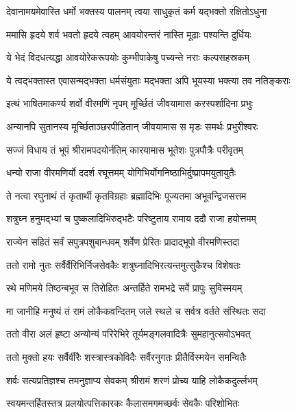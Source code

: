 
\twolineshloka
{देवानामयमेवास्ति धर्मो भक्तस्य पालनम्}
{त्वया साधुकृतं कर्म यद्भक्तो रक्षितोऽधुना}%

\twolineshloka
{ममासि हृदये शर्व भवतो हृदये त्वहम्}
{आवयोरन्तरं नास्ति मूढाः पश्यन्ति दुर्धियः}%

\twolineshloka
{ये भेदं विदधत्यद्धा आवयोरेकरूपयोः}
{कुम्भीपाकेषु पच्यन्ते नराः कल्पसहस्रकम्}%

\twolineshloka
{ये त्वद्भक्तास्त एवासन्मद्भक्ता धर्मसंयुताः}
{मद्भक्ता अपि भूयस्या भक्त्या तव नतिङ्कराः}%


\twolineshloka
{इत्थं भाषितमाकर्ण्य शर्वो वीरमणिं नृपम्}
{मूर्च्छितं जीवयामास करस्पर्शादिना प्रभुः}%

\twolineshloka
{अन्यानपि सुतानस्य मूर्च्छिताञ्छरपीडितान्}
{जीवयामास स मृडः समर्थः प्रभुरीश्वरः}%

\twolineshloka
{सज्जं विधाय तं भूपं श्रीरामपदयोर्नतिम्}
{कारयामास भूतेशः पुत्रपौत्रैः परीवृतम्}%

\twolineshloka
{धन्यो राजा वीरमणिर्यो ददर्श रघूत्तमम्}
{योगिभिर्योगनिष्ठाभिर्दुष्प्रापमयुतायुतैः}%

\twolineshloka
{ते नत्वा रघुनाथं तं कृतार्थी कृतविग्रहाः}
{ब्रह्मादिभिः पूज्यतमा अभूवन्द्विजसत्तम}%

\twolineshloka
{शत्रुघ्न हनुमद्भ्यां च पुष्कलादिभिरुद्भटैः}
{परिष्टुताय रामाय ददौ राजा हयोत्तमम्}%

\twolineshloka
{राज्येन सहितं सर्वं सपुत्रपशुबान्धवम्}
{शर्वेण प्रेरितः प्रादाद्भूपो वीरमणिस्तदा}%

\twolineshloka
{ततो रामो नुतः सर्वैर्वैरिभिर्निजसेवकैः}
{शत्रुघ्नादिभिरत्यन्तमुत्सुकैश्च विशेषतः}%

\twolineshloka
{रथे मणिमये तिष्ठन्बभूव स तिरोहितः}
{अन्तर्हिते रामभद्रे सर्वे प्रापुः सुविस्मयम्}%

\twolineshloka
{मा जानीहि मनुष्यं तं रामं लोकैकवन्दितम्}
{जले स्थले च सर्वत्र वर्तते संस्थितः सदा}%

\twolineshloka
{ततो वीरा अलं हृष्टा अन्योन्यं परिरेभिरे}
{तूर्यमङ्गलवादित्रैः सुमहानुत्सवोऽभवत्}%

\twolineshloka
{ततो मुक्तो हयः सर्वैर्वीरैः शस्त्रास्त्रकोविदैः}
{सर्वैरनुगतः प्रीतैर्विस्मयेन समन्वितैः}%

\twolineshloka
{शर्वः सत्यप्रतिज्ञश्च तमनुज्ञाप्य सेवकम्}
{श्रीरामं शरणं प्रोच्य याहि लोकैकदुर्ल्लभम्}%

\twolineshloka
{स्वयमन्तर्हितस्तत्र प्रलयोत्पत्तिकारकः}
{कैलासमगमच्छर्वः सेवकैः परिशोभितः}%

